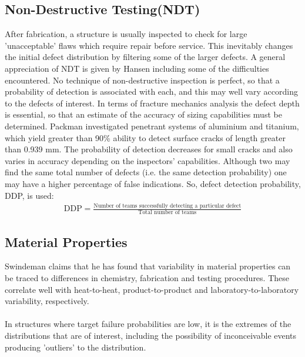 \documentclass[12pt]{article}
\begin{document}
\subsection{Non-Destructive Testing(NDT)}
After fabrication, a structure is usually inspected to check for large 'unacceptable'
flaws which require repair before service. This inevitably changes the initial defect
distribution by filtering some of the larger defects. A general appreciation of NDT is
given by Hansen including some of the difficulties encountered. No technique of
non-destructive inspection is perfect, so that a probability of detection is associated
with each, and this may well vary according to the defects of interest. In terms of
fracture mechanics analysis the defect depth is essential, so that an estimate of the
accuracy of sizing capabilities must be determined.
Packman investigated penetrant systems of aluminium and titanium,
which yield greater than 90\% ability to detect surface cracks of length greater than
0.939 mm. The probability of detection decreases for small cracks and also varies in
accuracy depending on the inspectors' capabilities. Although two may find the same
total number of defects (i.e. the same detection probability) one may have a higher
percentage of false indications.
So, defect detection probability, DDP, is used:
\begin{align}
    \text{DDP}=\frac{\text{Number of teams successfully detecting a particular defect}}{\text{Total number of teams}}
\end{align}
\subsection{Material Properties}
Swindeman claims that he has found that variability
in material properties can be traced to differences in chemistry, fabrication and
testing procedures. These correlate well with heat-to-heat, product-to-product and
laboratory-to-laboratory variability, respectively.\\\\
In structures where target failure probabilities are low, it is the extremes of the
distributions that are of interest, including the possibility of inconceivable events
producing 'outliers' to the distribution.
\end{document}
